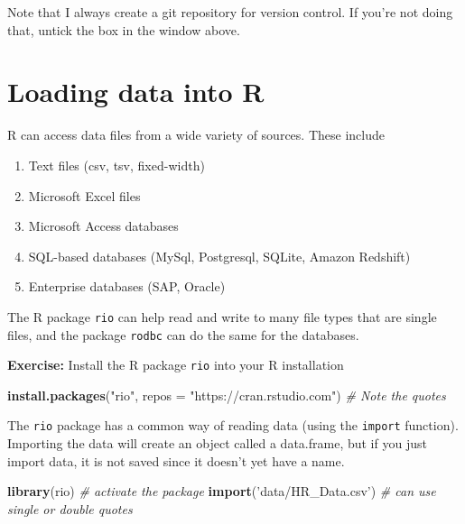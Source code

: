 \documentclass[12pt,letterpaperpaper,openany]{book}
\newenvironment{Shaded}{\begin{snugshade}}{\end{snugshade}}
\newcommand{\CommentTok}[1]{\textcolor[rgb]{0.56,0.35,0.01}{\textit{#1}}}
\newcommand{\DataTypeTok}[1]{\textcolor[rgb]{0.13,0.29,0.53}{#1}}
\newcommand{\KeywordTok}[1]{\textcolor[rgb]{0.13,0.29,0.53}{\textbf{#1}}}
\newcommand{\NormalTok}[1]{#1}
\newcommand{\StringTok}[1]{\textcolor[rgb]{0.31,0.60,0.02}{#1}}
\providecommand{\tightlist}{%
  \setlength{\itemsep}{0pt}\setlength{\parskip}{0pt}}
\begin{document}
Note that I always create a git repository for version control. If you're not doing that,
untick the box in the window above.

\hypertarget{loading-data-into-r}{%
\chapter{Loading data into R}\label{loading-data-into-r}}

R can access data files from a wide variety of sources. These include

\begin{enumerate}
\def\labelenumi{\arabic{enumi}.}
\tightlist
\item
  Text files (csv, tsv, fixed-width)
\item
  Microsoft Excel files
\item
  Microsoft Access databases
\item
  SQL-based databases (MySql, Postgresql, SQLite, Amazon Redshift)
\item
  Enterprise databases (SAP, Oracle)
\end{enumerate}

The R package \texttt{rio} can help read and write to many file types that are single files,
and the package \texttt{rodbc} can do the same for the databases.

 \textbf{Exercise:} Install the R package \texttt{rio} into your R installation

\begin{Shaded}
\begin{Highlighting}[]
\KeywordTok{install.packages}\NormalTok{(}\StringTok{"rio"}\NormalTok{, }\DataTypeTok{repos =} \StringTok{"https://cran.rstudio.com"}\NormalTok{) }\CommentTok{# Note the quotes}
\end{Highlighting}
\end{Shaded}

The \texttt{rio} package has a common way of reading data (using the \texttt{import} function).
Importing the data will create an object called a data.frame, but if you
just import data, it is not saved since it doesn't yet have a name.

\begin{Shaded}
\begin{Highlighting}[]
\KeywordTok{library}\NormalTok{(rio) }\CommentTok{# activate the package}
\KeywordTok{import}\NormalTok{(}\StringTok{'data/HR_Data.csv'}\NormalTok{) }\CommentTok{# can use single or double quotes}
\end{Highlighting}
\end{Shaded}
\end{document}
